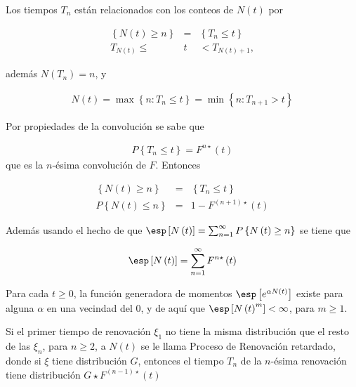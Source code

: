 Los tiempos $T_{n}$ est\'an relacionados con los conteos de $N\left(t\right)$ por

\begin{eqnarray*}
\left\{N\left(t\right)\geq n\right\}&=&\left\{T_{n}\leq t\right\}\\
T_{N\left(t\right)}\leq &t&<T_{N\left(t\right)+1},
\end{eqnarray*}

adem\'as $N\left(T_{n}\right)=n$, y 

\begin{eqnarray*}
N\left(t\right)=\max\left\{n:T_{n}\leq t\right\}=\min\left\{n:T_{n+1}>t\right\}
\end{eqnarray*}

Por propiedades de la convoluci\'on se sabe que

\begin{eqnarray*}
P\left\{T_{n}\leq t\right\}=F^{n\star}\left(t\right)
\end{eqnarray*}
que es la $n$-\'esima convoluci\'on de $F$. Entonces 

\begin{eqnarray*}
\left\{N\left(t\right)\geq n\right\}&=&\left\{T_{n}\leq t\right\}\\
P\left\{N\left(t\right)\leq n\right\}&=&1-F^{\left(n+1\right)\star}\left(t\right)
\end{eqnarray*}

Adem\'as usando el hecho de que $\esp\left[N\left(t\right)\right]=\sum_{n=1}^{\infty}P\left\{N\left(t\right)\geq n\right\}$
se tiene que

\begin{eqnarray*}
\esp\left[N\left(t\right)\right]=\sum_{n=1}^{\infty}F^{n\star}\left(t\right)
\end{eqnarray*}

\begin{Prop}
Para cada $t\geq0$, la funci\'on generadora de momentos $\esp\left[e^{\alpha N\left(t\right)}\right]$ existe para alguna $\alpha$ en una vecindad del 0, y de aqu\'i que $\esp\left[N\left(t\right)^{m}\right]<\infty$, para $m\geq1$.
\end{Prop}


\begin{Note}
Si el primer tiempo de renovaci\'on $\xi_{1}$ no tiene la misma distribuci\'on que el resto de las $\xi_{n}$, para $n\geq2$, a $N\left(t\right)$ se le llama Proceso de Renovaci\'on retardado, donde si $\xi$ tiene distribuci\'on $G$, entonces el tiempo $T_{n}$ de la $n$-\'esima renovaci\'on tiene distribuci\'on $G\star F^{\left(n-1\right)\star}\left(t\right)$
\end{Note}


